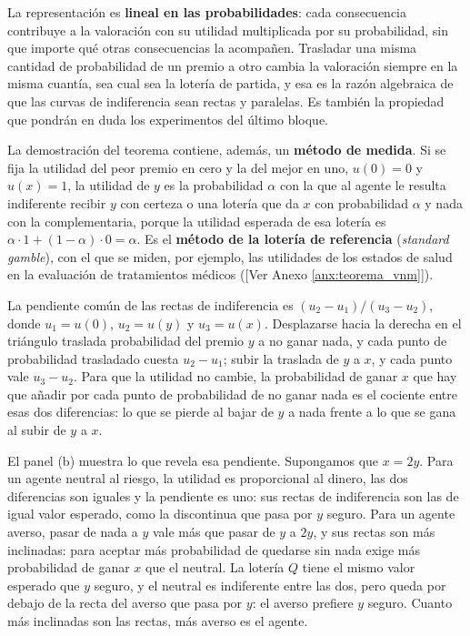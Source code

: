 \documentclass[10pt,a4paper]{article}
\newcommand{\authorfont}[1]{{\fontfamily{EBGaramond-TLF}\selectfont #1}}
\begin{document}
La representación es \textbf{lineal en las probabilidades}: cada consecuencia contribuye a la valoración con su utilidad multiplicada por su probabilidad, sin que importe qué otras consecuencias la acompañen. Trasladar una misma cantidad de probabilidad de un premio a otro cambia la valoración siempre en la misma cuantía, sea cual sea la lotería de partida, y esa es la razón algebraica de que las curvas de indiferencia sean rectas y paralelas. Es también la propiedad que pondrán en duda los experimentos del último bloque.

La demostración del teorema contiene, además, un \textbf{método de medida}. Si se fija la utilidad del peor premio en cero y la del mejor en uno, $u(0)=0$ y $u(x)=1$, la utilidad de $y$ es la probabilidad $\alpha$ con la que al agente le resulta indiferente recibir $y$ con certeza o una lotería que da $x$ con probabilidad $\alpha$ y nada con la complementaria, porque la utilidad esperada de esa lotería es $\alpha\cdot1+(1-\alpha)\cdot0=\alpha$. Es el \textbf{método de la lotería de referencia} (\textit{standard gamble}), con el que se miden, por ejemplo, las utilidades de los estados de salud en la evaluación de tratamientos médicos ([\authorfont{Ver Anexo \ref{anx:teorema_vnm}}]).

La pendiente común de las rectas de indiferencia es $(u_2-u_1)/(u_3-u_2)$, donde $u_1=u(0)$, $u_2=u(y)$ y $u_3=u(x)$. Desplazarse hacia la derecha en el triángulo traslada probabilidad del premio $y$ a no ganar nada, y cada punto de probabilidad trasladado cuesta $u_2-u_1$; subir la traslada de $y$ a $x$, y cada punto vale $u_3-u_2$. Para que la utilidad no cambie, la probabilidad de ganar $x$ que hay que añadir por cada punto de probabilidad de no ganar nada es el cociente entre esas dos diferencias: lo que se pierde al bajar de $y$ a nada frente a lo que se gana al subir de $y$ a $x$.

El panel (b) muestra lo que revela esa pendiente. Supongamos que $x=2y$. Para un agente neutral al riesgo, la utilidad es proporcional al dinero, las dos diferencias son iguales y la pendiente es uno: sus rectas de indiferencia son las de igual valor esperado, como la discontinua que pasa por $y$ seguro. Para un agente averso, pasar de nada a $y$ vale más que pasar de $y$ a $2y$, y sus rectas son más inclinadas: para aceptar más probabilidad de quedarse sin nada exige más probabilidad de ganar $x$ que el neutral. La lotería $Q$ tiene el mismo valor esperado que $y$ seguro, y el neutral es indiferente entre las dos, pero queda por debajo de la recta del averso que pasa por $y$: el averso prefiere $y$ seguro. Cuanto más inclinadas son las rectas, más averso es el agente.
\end{document}
